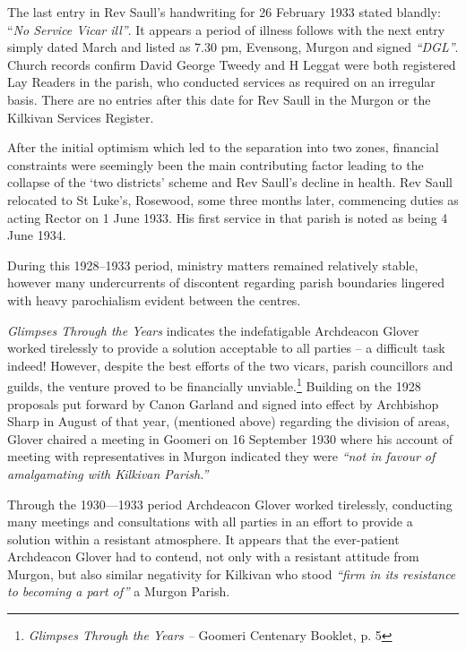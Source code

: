 The last entry in Rev Saull's handwriting for 26 February 1933 stated blandly: ``\emph{No Service Vicar ill''}. It appears a period of illness follows with the next entry simply dated March and listed as 7.30 pm, Evensong, Murgon and signed \emph{``DGL''}. Church records confirm David George Tweedy and H Leggat were both registered Lay Readers in the parish, who conducted services as required on an irregular basis. There are no entries after this date for Rev Saull in the Murgon or the Kilkivan Services Register.



After the initial optimism which led to the separation into two zones, financial constraints were seemingly been the main contributing factor leading to the collapse of the `two districts' scheme and Rev Saull's decline in health. Rev Saull relocated to St Luke's, Rosewood, some three months later, commencing duties as acting Rector on 1 June 1933. His first service in that parish is noted as being 4 June 1934.



During this 1928--1933 period, ministry matters remained relatively stable, however many undercurrents of discontent regarding parish boundaries lingered with heavy parochialism evident between the centres.



\emph{Glimpses Through the Years} indicates the indefatigable Archdeacon Glover worked tirelessly to provide a solution acceptable to all parties -- a difficult task indeed! However, despite the best efforts of the two vicars, parish councillors and guilds, the venture proved to be financially unviable.\footnote{\emph{Glimpses Through the Years --} Goomeri Centenary Booklet, p. 5} Building on the 1928 proposals put forward by Canon Garland and signed into effect by Archbishop Sharp in August of that year, (mentioned above) regarding the division of areas, Glover chaired a meeting in Goomeri on 16 September 1930 where his account of meeting with representatives in Murgon indicated they were \emph{``not in favour of amalgamating with Kilkivan Parish.''}


Through the 1930---1933 period Archdeacon Glover worked tirelessly, conducting many meetings and consultations with all parties in an effort to provide a solution within a resistant atmosphere. It appears that the ever-patient Archdeacon Glover had to contend, not only with a resistant attitude from Murgon, but also similar negativity for Kilkivan who stood \emph{``firm in its resistance to becoming a part of''} a Murgon Parish.



